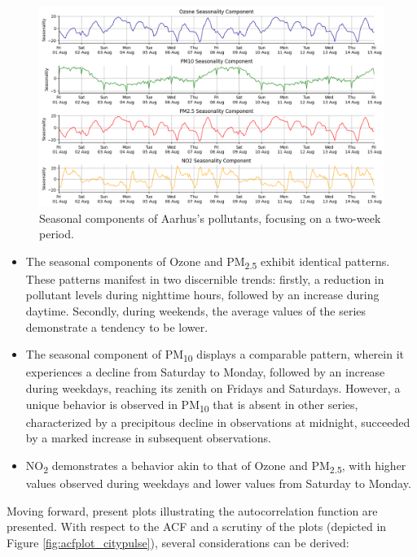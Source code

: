 \begin{figure}[h]
    \centering
    \includegraphics[width=1\linewidth]{images/citypulse_seasonality.png}
    \caption{Seasonal components of Aarhus's pollutants, focusing on a two-week period.}
    \label{fig:seasonality_aarhus}
\end{figure}

\begin{itemize}[noitemsep]
\item The seasonal components of Ozone and PM\textsubscript{2.5} exhibit identical patterns. These patterns manifest in two discernible trends: firstly, a reduction in pollutant levels during nighttime hours, followed by an increase during daytime. Secondly, during weekends, the average values of the series demonstrate a tendency to be lower.
\item The seasonal component of PM\textsubscript{10} displays a comparable pattern, wherein it experiences a decline from Saturday to Monday, followed by an increase during weekdays, reaching its zenith on Fridays and Saturdays. However, a unique behavior is observed in PM\textsubscript{10} that is absent in other series, characterized by a precipitous decline in observations at midnight, succeeded by a marked increase in subsequent observations.
\item NO\textsubscript{2} demonstrates a behavior akin to that of Ozone and PM\textsubscript{2.5}, with higher values observed during weekdays and lower values from Saturday to Monday.
\end{itemize}

Moving forward, present plots illustrating the autocorrelation function are presented. With respect to the ACF and a scrutiny of the plots (depicted in Figure \ref{fig:acfplot_citypulse}), several considerations can be derived:

